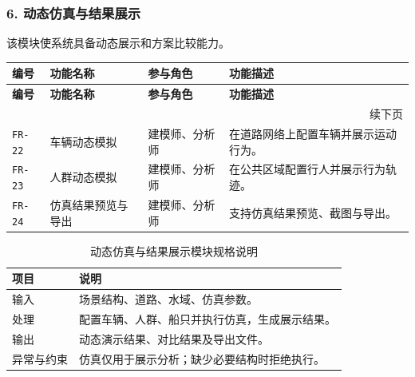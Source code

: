 \documentclass[UTF8,a4paper,10pt]{ctexart}
\begin{document}
\subsubsection*{6. 动态仿真与结果展示}
该模块使系统具备动态展示和方案比较能力。

{
\renewcommand{\arraystretch}{1.35}

\begin{longtable}{p{1.8cm} p{2.6cm} p{2.2cm} p{6.2cm}}
\toprule
\rowcolor{gray!20}
\textbf{编号} & \textbf{功能名称} & \textbf{参与角色} & \textbf{功能描述} \\
\midrule
\endfirsthead

\toprule
\rowcolor{gray!20}
\textbf{编号} & \textbf{功能名称} & \textbf{参与角色} & \textbf{功能描述} \\
\midrule
\endhead

\midrule
\multicolumn{4}{r}{\small 续下页}\\
\endfoot

\bottomrule
\endlastfoot

\texttt{FR-22} & 车辆动态模拟 & 建模师、分析师 & 在道路网络上配置车辆并展示运动行为。 \\
\texttt{FR-23} & 人群动态模拟 & 建模师、分析师 & 在公共区域配置行人并展示行为轨迹。 \\
\texttt{FR-24} & 仿真结果预览与导出 & 建模师、分析师 & 支持仿真结果预览、截图与导出。 \\

\end{longtable}
}

{
\renewcommand{\arraystretch}{1.3}

\begin{table}[H]
\centering
\caption{动态仿真与结果展示模块规格说明}

\begin{tabularx}{\textwidth}{p{2.6cm} Y}
\toprule
{}
\textbf{项目} & \textbf{说明} \\
\midrule

输入 & 场景结构、道路、水域、仿真参数。 \\
处理 & 配置车辆、人群、船只并执行仿真，生成展示结果。 \\
输出 & 动态演示结果、对比结果及导出文件。 \\
异常与约束 & 仿真仅用于展示分析；缺少必要结构时拒绝执行。 \\

\bottomrule
\end{tabularx}
\end{table}
}
\end{document}
